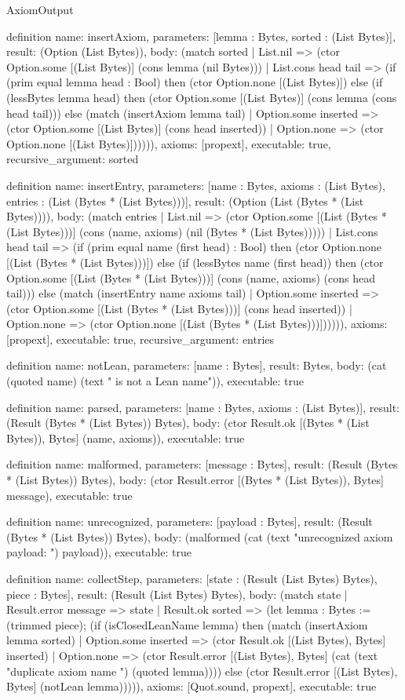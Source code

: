 \begin{lexlean}{AxiomOutput}
\begin{semanticmodule}
definition{
  name: insertAxiom,
  parameters: [lemma : Bytes, sorted : (List Bytes)],
  result: (Option (List Bytes)),
  body: (match sorted
    | List.nil => (ctor Option.some [(List Bytes)] (cons lemma (nil Bytes)))
    | List.cons head tail => (if (prim equal lemma head : Bool) then (ctor Option.none [(List Bytes)]) else (if (lessBytes lemma head) then (ctor Option.some [(List Bytes)] (cons lemma (cons head tail))) else (match (insertAxiom lemma tail)
      | Option.some inserted => (ctor Option.some [(List Bytes)] (cons head inserted))
      | Option.none => (ctor Option.none [(List Bytes)]))))),
  axioms: [propext],
  executable: true,
  recursive_argument: sorted
}

definition{
  name: insertEntry,
  parameters: [name : Bytes, axioms : (List Bytes), entries : (List (Bytes * (List Bytes)))],
  result: (Option (List (Bytes * (List Bytes)))),
  body: (match entries
    | List.nil => (ctor Option.some [(List (Bytes * (List Bytes)))] (cons (name, axioms) (nil (Bytes * (List Bytes)))))
    | List.cons head tail => (if (prim equal name (first head) : Bool) then (ctor Option.none [(List (Bytes * (List Bytes)))]) else (if (lessBytes name (first head)) then (ctor Option.some [(List (Bytes * (List Bytes)))] (cons (name, axioms) (cons head tail))) else (match (insertEntry name axioms tail)
      | Option.some inserted => (ctor Option.some [(List (Bytes * (List Bytes)))] (cons head inserted))
      | Option.none => (ctor Option.none [(List (Bytes * (List Bytes)))]))))),
  axioms: [propext],
  executable: true,
  recursive_argument: entries
}

definition{
  name: notLean,
  parameters: [name : Bytes],
  result: Bytes,
  body: (cat (quoted name) (text " is not a Lean name")),
  executable: true
}

definition{
  name: parsed,
  parameters: [name : Bytes, axioms : (List Bytes)],
  result: (Result (Bytes * (List Bytes)) Bytes),
  body: (ctor Result.ok [(Bytes * (List Bytes)), Bytes] (name, axioms)),
  executable: true
}

definition{
  name: malformed,
  parameters: [message : Bytes],
  result: (Result (Bytes * (List Bytes)) Bytes),
  body: (ctor Result.error [(Bytes * (List Bytes)), Bytes] message),
  executable: true
}

definition{
  name: unrecognized,
  parameters: [payload : Bytes],
  result: (Result (Bytes * (List Bytes)) Bytes),
  body: (malformed (cat (text "unrecognized axiom payload: ") payload)),
  executable: true
}

definition{
  name: collectStep,
  parameters: [state : (Result (List Bytes) Bytes), piece : Bytes],
  result: (Result (List Bytes) Bytes),
  body: (match state
    | Result.error message => state
    | Result.ok sorted => (let lemma : Bytes := (trimmed piece); (if (isClosedLeanName lemma) then (match (insertAxiom lemma sorted)
      | Option.some inserted => (ctor Result.ok [(List Bytes), Bytes] inserted)
      | Option.none => (ctor Result.error [(List Bytes), Bytes] (cat (text "duplicate axiom name ") (quoted lemma)))) else (ctor Result.error [(List Bytes), Bytes] (notLean lemma))))),
  axioms: [Quot.sound, propext],
  executable: true
}


\end{semanticmodule}
\end{lexlean}
